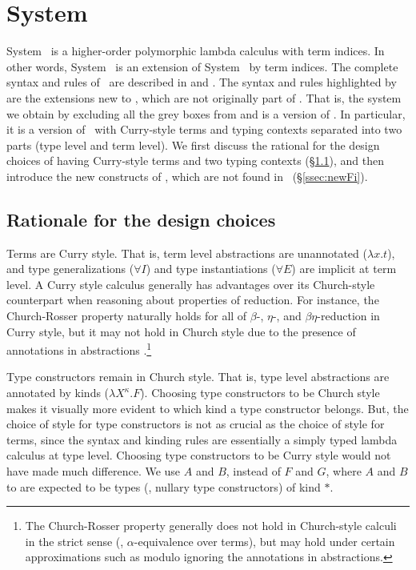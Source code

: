 \section{System \Fi}
\label{sec:Fi}
System \Fi\ is a higher-order polymorphic lambda calculus with term indices.
In other words, System \Fi\ is an extension of System \Fw\ by term indices.
The complete syntax and rules of \Fi\ are described in  and
. The syntax and rules highlighted by 
are the extensions new to \Fi, which are not originally part of \Fw.
That is, the system we obtain by excluding all the grey boxes from 
and  is a version of \Fw. In particular, it is a version of \Fw\
with Curry-style terms and typing contexts separated into two parts
(type level and term level). We first discuss the rational for
the design choices of having Curry-style terms and two typing contexts
(\S\ref{ssec:rationale}), and then introduce the new constructs of \Fi,
which are not found in \Fw\ (\S\ref{ssec:newFi}).

\subsection{Rationale for the design choices} \label{ssec:rationale}
Terms are Curry style. That is, term level abstractions are unannotated
($\lambda x.t$), and type generalizations ($\forall I$) and type instantiations
($\forall E$) are implicit at term level. A Curry style calculus generally has
advantages over its Church-style counterpart when reasoning about properties of
reduction. For instance, the Church-Rosser property naturally holds for all
of $\beta$-, $\eta$-, and $\beta\eta$-reduction in Curry style, but
it may not hold in Church style due to the presence of annotations in
abstractions \cite{Miquel01}.\footnote{The Church-Rosser property generally
	does not hold in Church-style calculi in the strict sense
	(\ie, $\alpha$-equivalence over terms), but may hold under
	certain approximations such as modulo ignoring the annotations
	in abstractions.}

Type constructors remain in Church style. That is, type level abstractions are
annotated by kinds ($\lambda X^\kappa.F$). Choosing type constructors
to be Church style makes it visually more evident to which kind
a type constructor belongs. But, the choice of style for type constructors
is not as crucial as the choice of style for terms, since the syntax and
kinding rules are essentially a simply typed lambda calculus at type level.
Choosing type constructors to be Curry style would not have made
much difference. We use $A$ and $B$, instead of $F$ and $G$, where
$A$ and $B$ to are expected to be types (\ie, nullary type constructors)
of kind $*$.

